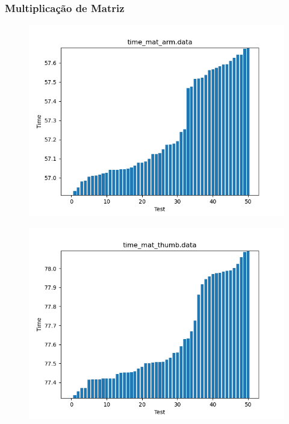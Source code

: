 \documentclass[a4paper,10pt]{article}
\begin{document}
\subsubsection*{Multiplicação de Matriz}
\begin{figure}[H]
 \includegraphics[width=\linewidth]{data/time_mat_arm_sorted.png}
\end{figure}

\begin{figure}[H]
 \includegraphics[width=\linewidth]{data/time_mat_thumb_sorted.png}
\end{figure}
\end{document}
